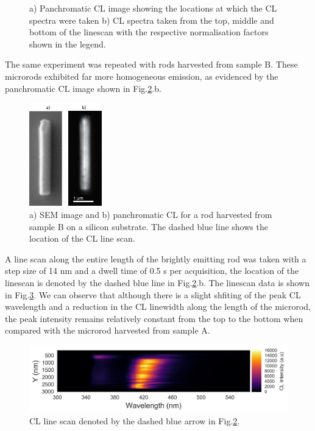 \begin{figure}[!th]
	\caption{a) Panchromatic CL image showing the locations at which the CL spectra were taken b) CL spectra taken from the top, middle and bottom of the linescan with the respective normalisation factors shown in the legend.}
	\label{A-spectra}
\end{figure}
\FloatBarrier

The same experiment was repeated with rods harvested from sample B. These microrods exhibited far more homogeneous emission, as evidenced by the panchromatic CL image shown in Fig.\ref{sampleBscan}.b. 
\begin{figure}[!ht]
	\centering
	\includegraphics[width=0.28\textwidth]{Figs/Ch6/B-2CL-scan.png}
	\caption {a) SEM image and b) panchromatic CL for a rod harvested from sample B on a silicon substrate. The dashed blue line shows the location of the CL line scan.}
	\label{sampleBscan}
\end{figure}
\FloatBarrier

A line scan along the entire length of the brightly emitting rod was taken with a step size of 14 nm and a dwell time of 0.5 s per acquisition, the location of the linescan is denoted by the dashed blue line in Fig.\ref{sampleBscan}.b. The linescan data is shown in Fig.\ref{sampleBscanCL}. We can observe that although there is a slight shfiting of the peak CL wavelength and a reduction in the CL linewidth along the length of the microrod, the peak intensity remains relatively constant from the top to the bottom when compared with the microrod harvested from sample A.

\begin{figure}[!h]
	\centering
	\includegraphics[width=1\textwidth]{Figs/Ch6/CLscan1}
	\caption{CL line scan denoted by the dashed blue arrow in Fig.\ref{sampleBscan}.}
	\label{sampleBscanCL}
\end{figure}
\FloatBarrier

